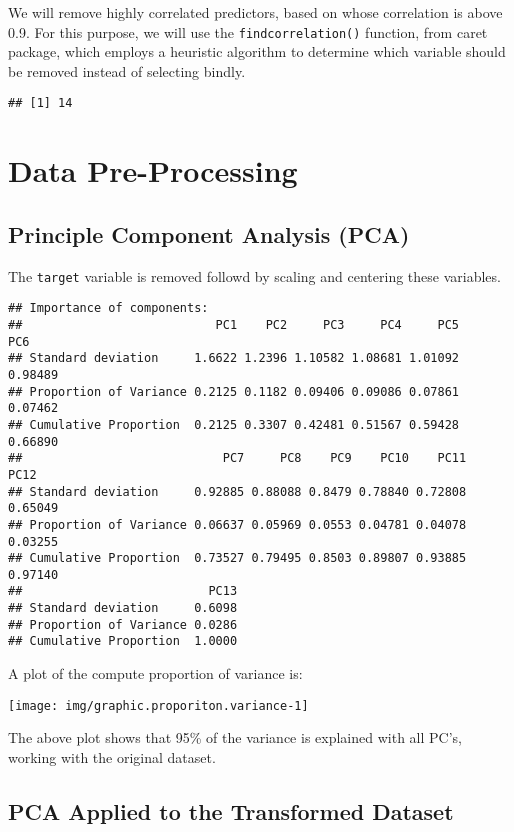 \documentclass[]{article}
\begin{document}
We will remove highly correlated predictors, based on whose correlation
is above 0.9. For this purpose, we will use the
\texttt{findcorrelation()} function, from caret package, which employs a
heuristic algorithm to determine which variable should be removed
instead of selecting bindly.

\begin{verbatim}
## [1] 14
\end{verbatim}

\hypertarget{data-pre-processing}{%
\section{Data Pre-Processing}\label{data-pre-processing}}

\hypertarget{principle-component-analysis-pca}{%
\subsection{Principle Component Analysis
(PCA)}\label{principle-component-analysis-pca}}

The \texttt{target} variable is removed followd by scaling and centering
these variables.

\begin{verbatim}
## Importance of components:
##                           PC1    PC2     PC3     PC4     PC5     PC6
## Standard deviation     1.6622 1.2396 1.10582 1.08681 1.01092 0.98489
## Proportion of Variance 0.2125 0.1182 0.09406 0.09086 0.07861 0.07462
## Cumulative Proportion  0.2125 0.3307 0.42481 0.51567 0.59428 0.66890
##                            PC7     PC8    PC9    PC10    PC11    PC12
## Standard deviation     0.92885 0.88088 0.8479 0.78840 0.72808 0.65049
## Proportion of Variance 0.06637 0.05969 0.0553 0.04781 0.04078 0.03255
## Cumulative Proportion  0.73527 0.79495 0.8503 0.89807 0.93885 0.97140
##                          PC13
## Standard deviation     0.6098
## Proportion of Variance 0.0286
## Cumulative Proportion  1.0000
\end{verbatim}

A plot of the compute proportion of variance is:

\begin{center}\texttt{[image: img/graphic.proporiton.variance-1]} \end{center}

The above plot shows that 95\% of the variance is explained with all
PC's, working with the original dataset.

\hypertarget{pca-applied-to-the-transformed-dataset}{%
\subsection{PCA Applied to the Transformed
Dataset}\label{pca-applied-to-the-transformed-dataset}}
\end{document}
